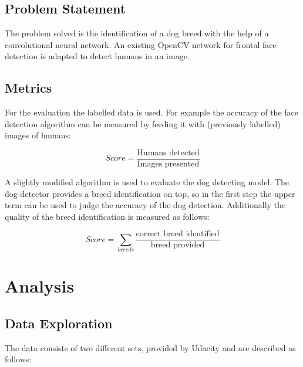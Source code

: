 \documentclass[paper=A4, DIV=10, parskip=half]{scrartcl}
\begin{document}



\subsection*{Problem Statement}

The problem solved is the identification of a dog breed with the help of a convolutional
neural network. An existing OpenCV network for frontal face detection is adapted
to detect humans in an image.


\subsection*{Metrics}

For the evaluation the labelled data is used. For example the accuracy of the face
detection algorithm can be measured by feeding it with (previously labelled) images of
humans: 

$$ Score = \frac{\textrm{Humans detected}}{\textrm{Images presented}}$$

A slightly modified algorithm is used to evaluate the dog detecting model. The dog
detector provides a breed identification on top, so in the first step the upper term can
be used to judge the accuracy of the dog detection. Additionally the quality of the breed
identification is measured as follows:

$$ Score = \sum_{breeds}{\frac{\textrm{correct breed identified}}{\textrm{breed provided}}} $$



\section*{Analysis}

\subsection*{Data Exploration}

The data consists of two different sets, provided by Udacity and are described as follows:
\end{document}
